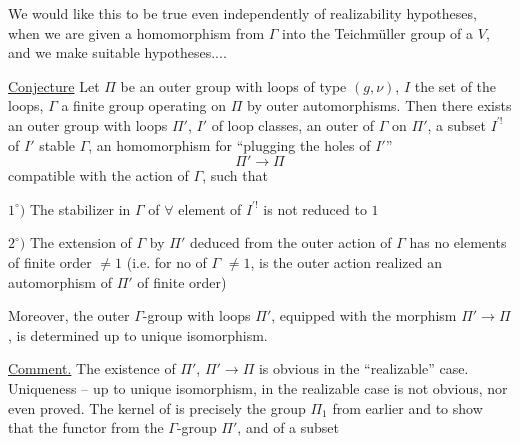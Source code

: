 We would like this to be true even independently of realizability hypotheses,
when we are given a homomorphism from $\Gamma$ into the Teichmüller group of a $V$,
and we make  suitable hypotheses....

\uline{Conjecture} Let $\Pi$ be an outer group with loops of type $(g,\nu)$,
$I$ the set  of the  loops,
$\Gamma$ a finite group operating on $\Pi$ by outer automorphisms.
Then there exists an outer group with loops $\Pi'$,  $I'$ of loop
classes, an outer  of $\Gamma$ on $\Pi'$, a subset
$I^{\prime!}$ of $I'$ stable  $\Gamma$, an  homomorphism
for ``plugging the holes of $I'$''
\[
\Pi'\longrightarrow\Pi
\]
compatible with the action of $\Gamma$, such that


$1^\circ)$ The stabilizer in $\Gamma$ of $\forall$ element of $I^{\prime!}$ is not reduced to $1$

$2^\circ)$ The extension of $\Gamma$ by $\Pi'$ deduced from the outer action of $\Gamma$ has no elements of finite order $\ne 1$ (i.e. for no  of $\Gamma$ $\ne 1$, is the outer action  realized  an automorphism of $\Pi'$ of finite order)

Moreover, the outer $\Gamma$-group with loops $\Pi'$, equipped with the morphism $\Pi'\longrightarrow\Pi$, is determined up to unique isomorphism.

 \uline{Comment.} The existence of $\Pi'$,  $\Pi'\longrightarrow\Pi$ is obvious in the ``realizable'' case. Uniqueness -- up to unique isomorphism,  in the realizable case is not obvious, nor even proved. The kernel of 
is precisely the group $\Pi_1$ from earlier
and to show that the functor from the    $\Gamma$-group $\Pi'$,  and of a subset

